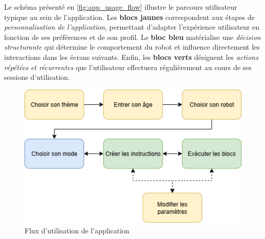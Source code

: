 Le schéma présenté en \autoref{fig:app_usage_flow} illustre le parcours utilisateur typique au sein de l’application. 
Les \textbf{blocs jaunes} correspondent aux étapes de \textit{personnalisation de l'application}, permettant d'adapter l'expérience utilisateur en fonction de ses préférences et de son profil.
Le \textbf{bloc bleu} matérialise une \textit{décision structurante} qui détermine le comportement du robot et influence directement les interactions dans les écrans suivants.
Enfin, les \textbf{blocs verts} désignent les \textit{actions répétées et récurrentes} que l’utilisateur effectuera régulièrement au cours de ses sessions d'utilisation.

\begin{figure}[H]
    \centering
    \includegraphics[width=0.75\linewidth]{figures//flow.png}
    \caption{\label{fig:app_usage_flow} Flux d'utilisation de l'application}
\end{figure}

